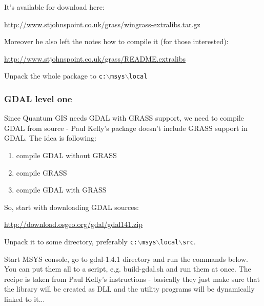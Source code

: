 It's available for download here:

\url{http://www.stjohnspoint.co.uk/grass/wingrass-extralibs.tar.gz}

Moreover he also left the notes how to compile it (for those interested):

\url{http://www.stjohnspoint.co.uk/grass/README.extralibs}

Unpack the whole package to \texttt{c:$\backslash$msys$\backslash$local}

\subsubsection{GDAL level one}
Since Quantum GIS needs GDAL with GRASS support, we need to compile GDAL
from source - Paul Kelly's package doesn't include GRASS support in GDAL.
The idea is following:

\begin{enumerate}
\item compile GDAL without GRASS
\item compile GRASS
\item compile GDAL with GRASS
\end{enumerate}

So, start with downloading GDAL sources:

\url{http://download.osgeo.org/gdal/gdal141.zip}

Unpack it to some directory, preferably \texttt{c:$\backslash$msys$\backslash$local$\backslash$src}.

Start MSYS console, go to gdal-1.4.1 directory and run the commands below.
You can put them all to a script, e.g. build-gdal.sh and run them at once.
The recipe is taken from Paul Kelly's instructions - basically they
just make sure that the library will be created as DLL and the utility
programs will be dynamically linked to it...

